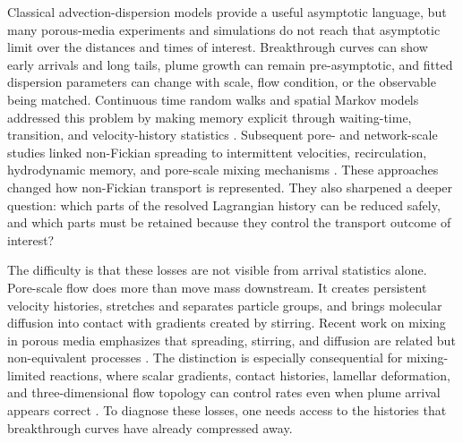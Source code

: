 \documentclass[11pt]{article}
\begin{document}
Classical advection-dispersion models provide a useful asymptotic language, but many porous-media experiments and simulations do not reach that asymptotic limit over the distances and times of interest. Breakthrough curves can show early arrivals and long tails, plume growth can remain pre-asymptotic, and fitted dispersion parameters can change with scale, flow condition, or the observable being matched. Continuous time random walks and spatial Markov models addressed this problem by making memory explicit through waiting-time, transition, and velocity-history statistics \citep{Berkowitz2006,Bijeljic2006,LeBorgne2008a,LeBorgne2008b,DeAnna2013,Dentz2016,Sherman2021}. Subsequent pore- and network-scale studies linked non-Fickian spreading to intermittent velocities, recirculation, hydrodynamic memory, and pore-scale mixing mechanisms \citep{Crevacore2016,YangWang2019,Puyguiraud2019,Puyguiraud2021,Liu2024Dispersion}. These approaches changed how non-Fickian transport is represented. They also sharpened a deeper question: which parts of the resolved Lagrangian history can be reduced safely, and which parts must be retained because they control the transport outcome of interest?

The difficulty is that these losses are not visible from arrival statistics alone. Pore-scale flow does more than move mass downstream. It creates persistent velocity histories, stretches and separates particle groups, and brings molecular diffusion into contact with gradients created by stirring. Recent work on mixing in porous media emphasizes that spreading, stirring, and diffusion are related but non-equivalent processes \citep{Valocchi2019,Dentz2023,DePaoli2023,DePaoli2025}. The distinction is especially consequential for mixing-limited reactions, where scalar gradients, contact histories, lamellar deformation, and three-dimensional flow topology can control rates even when plume arrival appears correct \citep{DeAnna2014,Paster2013,Bolster2016,BensonBolster2016,Engdahl2017,LeeKang2020,Shafabakhsh2024,Hallack2025,Farhat2025,Hallack2025Fracture}. To diagnose these losses, one needs access to the histories that breakthrough curves have already compressed away.
\end{document}
